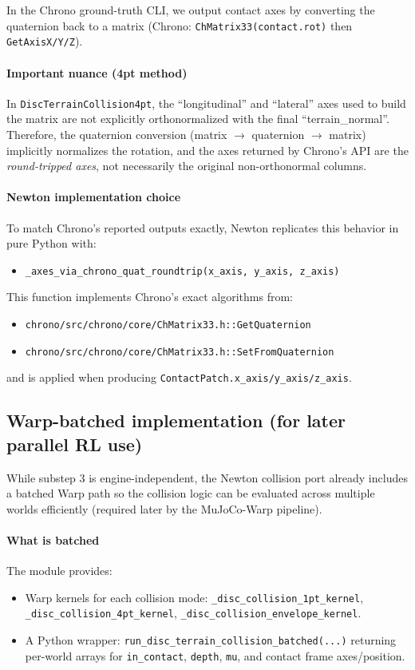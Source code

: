In the Chrono ground-truth CLI, we output contact axes by converting the quaternion back to a matrix
(Chrono: \texttt{ChMatrix33(contact.rot)} then \texttt{GetAxisX/Y/Z}).

\paragraph{Important nuance (4pt method)}
In \texttt{DiscTerrainCollision4pt}, the ``longitudinal'' and ``lateral'' axes used to build the matrix are
not explicitly orthonormalized with the final ``terrain\_normal''.
Therefore, the quaternion conversion (matrix \(\rightarrow\) quaternion \(\rightarrow\) matrix)
implicitly normalizes the rotation, and the axes returned by Chrono's API are the \emph{round-tripped axes},
not necessarily the original non-orthonormal columns.

\paragraph{Newton implementation choice}
To match Chrono's reported outputs exactly, Newton replicates this behavior in pure Python with:
\begin{itemize}
  \item \texttt{\_axes\_via\_chrono\_quat\_roundtrip(x\_axis, y\_axis, z\_axis)}
\end{itemize}
This function implements Chrono's exact algorithms from:
\begin{itemize}
  \item \texttt{chrono/src/chrono/core/ChMatrix33.h::GetQuaternion}
  \item \texttt{chrono/src/chrono/core/ChMatrix33.h::SetFromQuaternion}
\end{itemize}
and is applied when producing \texttt{ContactPatch.x\_axis/y\_axis/z\_axis}.

\subsection{Warp-batched implementation (for later parallel RL use)}
While substep 3 is engine-independent, the Newton collision port already includes a batched Warp path so the
collision logic can be evaluated across multiple worlds efficiently (required later by the MuJoCo-Warp pipeline).

\paragraph{What is batched}
The module provides:
\begin{itemize}
  \item Warp kernels for each collision mode:
    \texttt{\_disc\_collision\_1pt\_kernel},
    \texttt{\_disc\_collision\_4pt\_kernel},
    \texttt{\_disc\_collision\_envelope\_kernel}.
  \item A Python wrapper:
    \texttt{run\_disc\_terrain\_collision\_batched(...)} returning per-world arrays for
    \texttt{in\_contact}, \texttt{depth}, \texttt{mu}, and contact frame axes/position.
\end{itemize}

